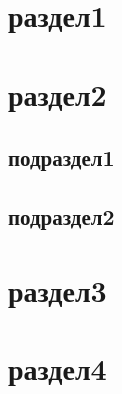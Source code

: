 \section{раздел1}
\lipsum[20-25]
\section{раздел2}
\subsection{подраздел1}
\lipsum[20-25]
\subsection{подраздел2}
\lipsum[20-25]
\section{раздел3}
\lipsum[20-25]
\section{раздел4}
\lipsum[20-25]
